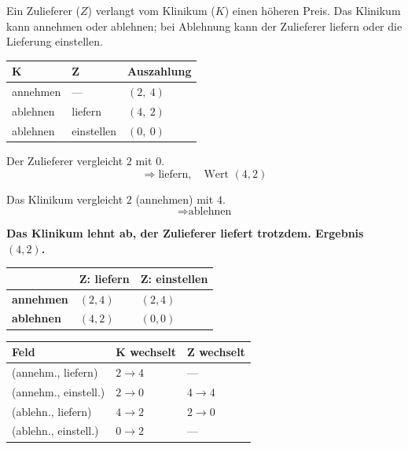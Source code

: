 \begin{aufgabe}
Ein Zulieferer ($Z$) verlangt vom Klinikum ($K$) einen höheren Preis. Das Klinikum kann annehmen oder ablehnen; bei Ablehnung kann der Zulieferer liefern oder die Lieferung einstellen.
\begin{center}
{\small
\renewcommand{\arraystretch}{1.5}
\begin{tabular}{@{}P{2.2cm}P{2.6cm}P{2.6cm}@{}}
\toprule
\textbf{K} & \textbf{Z} & \textbf{Auszahlung}\\
\midrule
annehmen & --- & $(2,\ 4)$\\
ablehnen & liefern & $(4,\ 2)$\\
ablehnen & einstellen & $(0,\ 0)$\\
\bottomrule
\end{tabular}}
\end{center}

\loesung
{}
 Der Zulieferer vergleicht $2$ mit $0$.
\[ \Longrightarrow \text{liefern}, \quad \text{Wert } (4,2) \]

 Das Klinikum vergleicht $2$ (annehmen) mit $4$.
\[ \Longrightarrow \text{ablehnen} \]

\begin{center}
\begin{minipage}{0.9\textwidth}
\textbf{Das Klinikum lehnt ab, der Zulieferer liefert trotzdem. Ergebnis $(4,2)$.}
\end{minipage}
\end{center}

\begin{center}
{\small
\renewcommand{\arraystretch}{1.6}
\begin{tabular}{@{}P{2.2cm}P{2.4cm}P{2.4cm}@{}}
\toprule
& \textbf{Z: liefern} & \textbf{Z: einstellen}\\
\midrule
\textbf{annehmen} & $(2,4)$ & $(2,4)$\\
\textbf{ablehnen} & $(4,2)$ & $(0,0)$\\
\bottomrule
\end{tabular}}
\end{center}

\begin{center}
{\small
\renewcommand{\arraystretch}{1.48}
\begin{tabular}{@{}P{3.0cm}P{2.2cm}P{2.2cm}@{}}
\toprule
\textbf{Feld} & \textbf{K wechselt} & \textbf{Z wechselt}\\
\midrule
(annehm., liefern) & $2\to4$ & --- \\
(annehm., einstell.) & $2\to0$ & $4\to4$ \\
(ablehn., liefern) & $4\to2$ & $2\to0$ \\
(ablehn., einstell.) & $0\to2$ & --- \\
\bottomrule
\end{tabular}}
\end{center}


\end{aufgabe}
